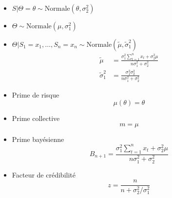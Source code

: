 \begin{itemize}
\item $S|\Theta = \theta \sim \text{Normale}(\theta, \sigma_2^2)$
\item $\Theta \sim \text{Normale}(\mu, \sigma_1^2)$
\item $\Theta|S_1 = x_1, \dots, S_n = x_n \sim
  \text{Normale}(\tilde{\mu}, \tilde{\sigma}_1^2)$
  \begin{align*}
    \tilde{\mu} &=
      \frac{\sigma_1^2 \sum_{t = 1}^n x_t + \sigma_2^2 \mu}{n \sigma_1^2 +
        \sigma_2^2} \\
    \tilde{\sigma}_1^2 &= \frac{\sigma_1^2 \sigma_2^2}{n
        \sigma_1^2 + \sigma_2^2}
  \end{align*}
\item Prime de risque
  \begin{equation*}
    \mu(\theta) = \theta
  \end{equation*}
\item Prime collective
  \begin{equation*}
    m = \mu
  \end{equation*}
\item Prime bayésienne
  \begin{equation*}
    B_{n + 1} =
      \frac{\sigma_1^2 \sum_{t = 1}^n x_t + \sigma_2^2 \mu}{n \sigma_1^2 +
        \sigma_2^2}
  \end{equation*}
\item Facteur de crédibilité
  \begin{equation*}
    z = \frac{n}{n + \sigma_2^2/\sigma_1^2}
  \end{equation*}
\end{itemize}

\endgroup

